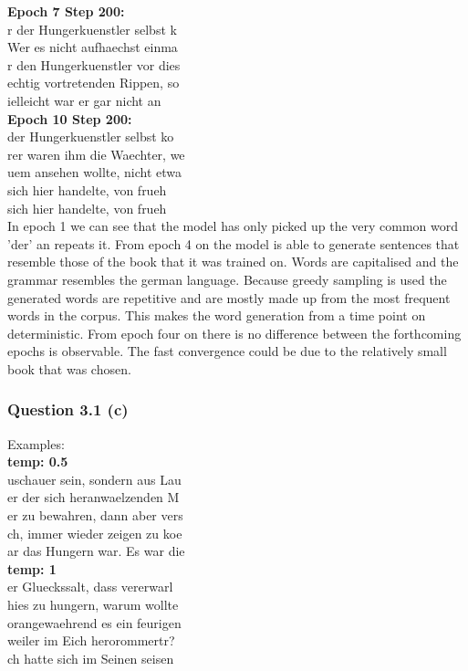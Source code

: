 \documentclass{article}
\begin{document}
{{{{{{{{\textbf{Epoch 7 Step 200:}\\ r der Hungerkuenstler selbst k	\\ Wer es nicht aufhaechst einma \\	r den Hungerkuenstler vor dies\\	echtig vortretenden Rippen, so\\	ielleicht war er gar nicht an\\

\textbf{Epoch 10 Step 200:}\\  der Hungerkuenstler selbst ko	\\rer waren ihm die Waechter, we \\	uem ansehen wollte, nicht etwa\\	 sich hier handelte, von frueh\\	 sich hier handelte, von frueh\\

In epoch 1 we can see that the model has only picked up the very common word 'der' an repeats it. From epoch 4 on the model is able to generate sentences that resemble those of the book that it was trained on. Words are capitalised and the grammar resembles the german language. Because greedy sampling is used the generated words are repetitive and are mostly made up from the most frequent words in the corpus. This makes the word generation from a time point on deterministic. From epoch four on there is no difference between the forthcoming epochs is observable. The fast convergence could be due to the relatively small book that was chosen. 

\subsubsection*{Question 3.1 (c)}
Examples: \\

\textbf{temp: 0.5} \\
uschauer sein, sondern aus Lau	\\
er der sich heranwaelzenden M	\\
er zu bewahren, dann aber vers	\\
ch, immer wieder zeigen zu koe	\\
ar das Hungern war. Es war die	\\


\textbf{temp: 1} \\
er Glueckssalt, dass vererwarl	\\
hies zu hungern, warum wollte	\\
orangewaehrend es ein feurigen	 \\
weiler im Eich herorommertr? 	\\
ch hatte sich im Seinen seisen\\

}}}}}}}}
\end{document}
